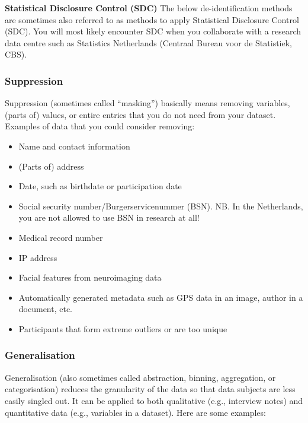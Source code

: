\documentclass[
]{book}
\providecommand{\tightlist}{%
  \setlength{\itemsep}{0pt}\setlength{\parskip}{0pt}}
\begin{document}
\textbf{Statistical Disclosure Control (SDC)}
The below de-identification methods are sometimes also referred to as methods
to apply Statistical Disclosure Control (SDC). You will most likely encounter
SDC when you collaborate with a research data centre such as Statistics
Netherlands (Centraal Bureau voor de Statistiek, CBS).

\hypertarget{suppression}{%
\subsubsection{Suppression}\label{suppression}}

Suppression (sometimes called ``masking'') basically means removing variables,
(parts of) values, or entire entries that you do not need from your dataset.
Examples of data that you could consider removing:

\begin{itemize}
\tightlist
\item
  Name and contact information
\item
  (Parts of) address
\item
  Date, such as birthdate or participation date
\item
  Social security number/Burgerservicenummer (BSN). NB. In the Netherlands, you
  are not allowed to use BSN in research at all!
\item
  Medical record number
\item
  IP address
\item
  Facial features from neuroimaging data
\item
  Automatically generated metadata such as GPS data in an image, author in a
  document, etc.
\item
  Participants that form extreme outliers or are too unique
\end{itemize}

\hypertarget{generalisation}{%
\subsubsection{Generalisation}\label{generalisation}}

Generalisation (also sometimes called abstraction, binning, aggregation, or
categorisation) reduces the granularity of the data so that data subjects are
less easily singled out. It can be applied to both qualitative (e.g., interview
notes) and quantitative data (e.g., variables in a dataset). Here are some
examples:
\end{document}
